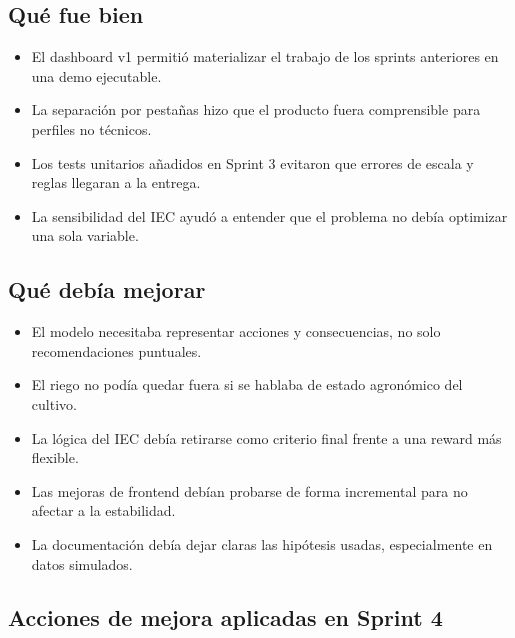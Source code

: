 \documentclass[11pt,a4paper]{article}
\begin{document}
\subsection{Qué fue bien}

\begin{itemize}
    \item El dashboard v1 permitió materializar el trabajo de los sprints anteriores en una demo ejecutable.
    \item La separación por pestañas hizo que el producto fuera comprensible para perfiles no técnicos.
    \item Los tests unitarios añadidos en Sprint 3 evitaron que errores de escala y reglas llegaran a la entrega.
    \item La sensibilidad del IEC ayudó a entender que el problema no debía optimizar una sola variable.
\end{itemize}

\subsection{Qué debía mejorar}

\begin{itemize}
    \item El modelo necesitaba representar acciones y consecuencias, no solo recomendaciones puntuales.
    \item El riego no podía quedar fuera si se hablaba de estado agronómico del cultivo.
    \item La lógica del IEC debía retirarse como criterio final frente a una reward más flexible.
    \item Las mejoras de frontend debían probarse de forma incremental para no afectar a la estabilidad.
    \item La documentación debía dejar claras las hipótesis usadas, especialmente en datos simulados.
\end{itemize}

\subsection{Acciones de mejora aplicadas en Sprint 4}
\end{document}

